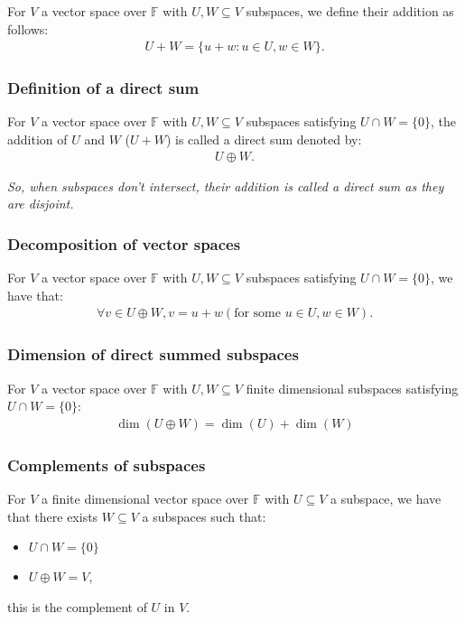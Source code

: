 \documentclass[a4paper, 12pt, twoside]{article}
\begin{document}
For $V$ a vector space over $\mathbb{F}$ with $U, W \subseteq V$
subspaces, we define their addition as follows:
\begin{align*}
  U + W = \{u + w : u \in U, w \in W\}.
\end{align*}

\subsubsection{Definition of a direct sum}

For $V$ a vector space over $\mathbb{F}$ with $U, W \subseteq V$
subspaces satisfying $U \cap W = \{0\}$, the addition of 
$U$ and $W$ ($U + W$) is called a direct sum denoted by:
\begin{align*}
  U \oplus W.
\end{align*}

\textit{So, when subspaces don't intersect, their addition is
called a direct sum as they are disjoint.}

\subsubsection{Decomposition of vector spaces}

For $V$ a vector space over $\mathbb{F}$ with $U, W \subseteq V$
subspaces satisfying $U \cap W = \{0\}$, we have that:
\begin{align*}
  \forall v \in U \oplus W, v = u + w (\text{for some } u \in U, w \in W).
\end{align*}

\subsubsection{Dimension of direct summed subspaces}

For $V$ a vector space over $\mathbb{F}$ with $U, W \subseteq V$
finite dimensional subspaces satisfying $U \cap W = \{0\}$:
\begin{align*}
  \dim(U \oplus W) = \dim(U) + \dim(W)
\end{align*}

\subsubsection{Complements of subspaces}

For $V$ a finite dimensional vector space over $\mathbb{F}$ 
with $U \subseteq V$ a subspace, we have that there exists
$W \subseteq V$ a subspaces such that:
\begin{itemize}
  \item $U \cap W = \{0\}$
  \item $U \oplus W = V$,
\end{itemize}
this is the complement of $U$ in $V$.
\end{document}

